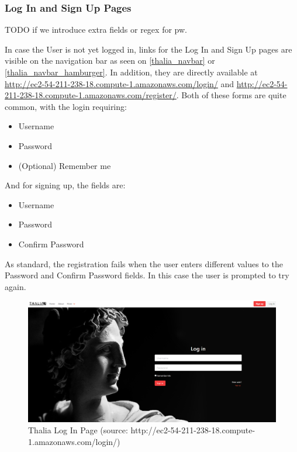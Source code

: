 \documentclass[main.tex]{subfiles}
\begin{document}
\subsubsection{Log In and Sign Up Pages}

TODO if we introduce extra  fields or regex for pw.

In case the User is not yet logged in, links for the Log In and Sign Up pages are visible on the navigation bar as seen on \figurename{\ref{thalia_navbar}} or \figurename{\ref{thalia_navbar_hamburger}}. In addition, they are directly available at \url{http://ec2-54-211-238-18.compute-1.amazonaws.com/login/} and \url{http://ec2-54-211-238-18.compute-1.amazonaws.com/register/}.
Both of these forms are quite common, with the login requiring:

\begin{itemize}
    \item Username
    \item Password
    \item (Optional) Remember me
\end{itemize}

And for signing up, the fields are:

\begin{itemize}
    \item Username
    \item Password
    \item Confirm Password
\end{itemize}

As standard, the registration fails when the user enters different values to the Password and Confirm Password fields. In this case the user is prompted to try again.

\begin{figure}[H]
   \centering
   \includegraphics[width=\textwidth]{10Appendices/081User/081Pictures/login.png}
   \caption{Thalia Log In Page (source: http://ec2-54-211-238-18.compute-1.amazonaws.com/login/)}
   \label{thalia_login}
\end{figure}
\end{document}
